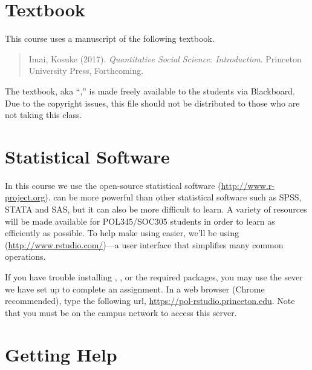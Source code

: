 \documentclass[11pt]{article}
\begin{document}
\section{Textbook}

This course uses a manuscript of the following textbook.
\begin{quote}
  Imai, Kosuke (2017). {\it Quantitative Social Science:
    Introduction}.  Princeton University Press, Forthcoming.
\end{quote}
The textbook, aka ``\QSS,'' is made freely available to the students
via Blackboard.  Due to the copyright issues, this file should not be
distributed to those who are not taking this class.


\section{Statistical Software}

In this course we use the open-source statistical software \R{}
(\url{http://www.r-project.org}).  \R{} can be more powerful than
other statistical software such as \textsf{SPSS}, \textsf{STATA} and
\textsf{SAS}, but it can also be more difficult to learn.  A variety
of resources will be made available for POL345/SOC305 students in
order to learn \R{} as efficiently as possible.  To help make using
\R{} easier, we'll be using \Rst{} (\url{http://www.rstudio.com/})---a
user interface that simplifies many common operations.

If you have trouble installing \R{}, \Rst{}, or the required \R{}
packages, you may use the \Rst{} sever we have set up to complete an
assignment. In a web browser (Chrome recommended), type the following
url, \url{https://pol-rstudio.princeton.edu}. Note that you must be on
the campus network to access this server.

\section{Getting Help}
\end{document}
